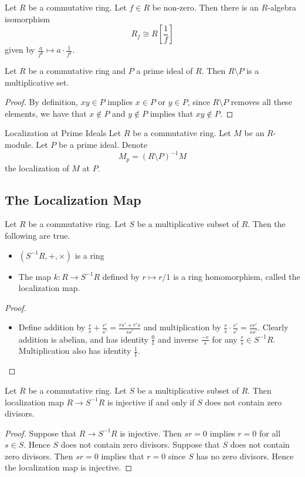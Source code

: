 \documentclass[a4paper]{article}
\begin{document}
\begin{lmm}{}{} Let $R$ be a commutative ring. Let $f\in R$ be non-zero. Then there is an $R$-algebra isomorphism $$R_f\cong R\left[\frac{1}{f}\right]$$ given by $\frac{a}{f^k}\mapsto a\cdot\frac{1}{f^k}$. 
\end{lmm}

\begin{lmm}{}{} Let $R$ be a commutative ring and $P$ a prime ideal of $R$. Then $R\setminus P$ is a multiplicative set. 
\begin{proof}
By definition, $xy\in P$ implies $x\in P$ or $y\in P$, since $R\setminus P$ removes all these elements, we have that $x\notin P$ and $y\notin P$ implies that $xy\notin P$. 
\end{proof}
\end{lmm}

\begin{defn}{Localization at Prime Ideals}{} Let $R$ be a commutative ring. Let $M$ be an $R$-module. Let $P$ be a prime ideal. Denote $$M_p=(R\setminus P)^{-1}M$$ the localization of $M$ at $P$. 
\end{defn}

\subsection{The Localization Map}
\begin{prp}{}{} Let $R$ be a commutative ring. Let $S$ be a multiplicative subset of $R$. Then the following are true. 
\begin{itemize}
\item $(S^{-1}R,+,\times)$ is a ring
\item The map $k:R\to S^{-1}R$ defined by $r\mapsto r/1$ is a ring homomorphism, called the localization map. 
\end{itemize}
\begin{proof}\\
\begin{itemize}
\item Define addition by $\frac{r}{s}+\frac{r'}{s'}=\frac{rs'+r's}{ss'}$ and multiplication by $\frac{r}{s}\cdot\frac{r'}{s'}=\frac{rr'}{ss'}$. Clearly addition is abelian, and has identity $\frac{0}{1}$ and inverse $\frac{-r}{s}$ for any $\frac{r}{s}\in S^{-1}R$. Multiplication also has identity $\frac{1}{1}$. 
\end{itemize}
\end{proof}
\end{prp}

\begin{lmm}{}{} Let $R$ be a commutative ring. Let $S$ be a multiplicative subset of $R$. Then localization map $R\to S^{-1}R$ is injective if and only if $S$ does not contain zero divisors. 
\begin{proof}
Suppose that $R\to S^{-1}R$ is injective. Then $sr=0$ implies $r=0$ for all $s\in S$. Hence $S$ does not contain zero divisors. Suppose that $S$ does not contain zero divisors. Then $sr=0$ implies that $r=0$ since $S$ has no zero divisors. Hence the localization map is injective. 
\end{proof}
\end{lmm}
\end{document}
